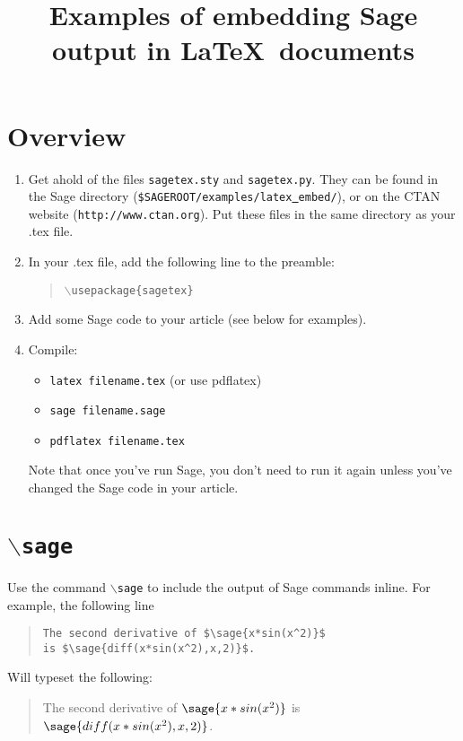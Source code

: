 \documentclass{article}
\title{Examples of embedding Sage output in \LaTeX\ documents}
\author{}
\def\bs{\ensuremath{\backslash}}
\begin{document}
\maketitle

\section{Overview}

\begin{enumerate}
\item
Get ahold of the files \texttt{sagetex.sty} and \texttt{sagetex.py}.  
They can be found in the Sage directory
(\texttt{\$SAGEROOT/examples/latex\underline{ }embed/}), or on the CTAN website
(\texttt{http://www.ctan.org}). Put these files in the same directory as your
.tex file.

\item
In your .tex file, add the following line to the preamble:
\begin{quote}
\texttt{{$\backslash$}usepackage\{sagetex\}}
\end{quote}

\item
Add some Sage code to your article (see below for examples).

\item
Compile:
\begin{itemize}
\item \texttt{latex filename.tex} (or use pdflatex)
\item \texttt{sage filename.sage}
\item \texttt{pdflatex filename.tex}
\end{itemize}
Note that once you've run Sage, you don't need to run it again unless you've
changed the Sage code in your article.
\end{enumerate}

\section{\texttt{{\bs}sage}}

Use the command \texttt{$\backslash$sage} to include the output of Sage
commands inline. For example, the following line
\begin{quote}
\begin{verbatim}
The second derivative of $\sage{x*sin(x^2)}$
is $\sage{diff(x*sin(x^2),x,2)}$.
\end{verbatim}
\end{quote}
Will typeset the following:
\begin{quote}
The second derivative of $\sage{x*sin(x^2)}$
is $\sage{diff(x*sin(x^2),x,2)}$.
\end{quote}
\end{document}

